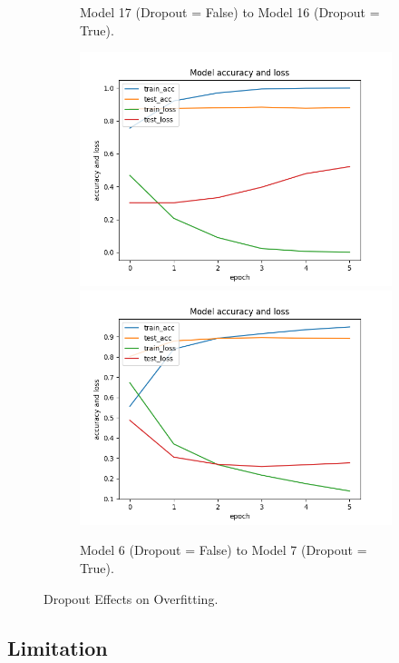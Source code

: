 \documentclass[11pt]{article}
\begin{document}
\begin{figure}[h!]
\begin{subfigure}{0.35\textwidth}
         \caption{Model 17 (Dropout = False) to Model 16 (Dropout = True).}
         \label{fig:dropout3}
\end{subfigure}
\hfill
\begin{subfigure}{0.35\textwidth}
         \centering
         \includegraphics[width=\textwidth]{model6.png}
\includegraphics[width=\textwidth]{model7.png}
         \caption{Model 6 (Dropout = False) to Model 7 (Dropout = True).}
         \label{fig:dropout4}
\end{subfigure}
\caption{Dropout Effects on Overfitting.}
\label{fig:dropout_effect}
\end{figure}


\subsection{Limitation}
\end{document}
